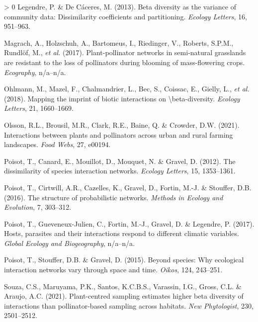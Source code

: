 \documentclass[10pt,oneside]{article}
\newlength{\cslhangindent}
\newenvironment{CSLReferences}[3] %
 {%
  \setlength{\parindent}{0pt}
  \ifodd #1 \everypar{\setlength{\hangindent}{\cslhangindent}}\ignorespaces\fi
  \ifnum #2 > 0
  \setlength{\parskip}{#2\baselineskip}
  \fi
 }%
 {}
\begin{document}
\begin{CSLReferences}{1}{0}
\leavevmode\hypertarget{ref-Legendre2013BetDiv}{}%
Legendre, P. \& De Cáceres, M. (2013). Beta diversity as the variance of
community data: Dissimilarity coefficients and partitioning.
\emph{Ecology Letters}, 16, 951--963.

\leavevmode\hypertarget{ref-Magrach2017PlaNet}{}%
Magrach, A., Holzschuh, A., Bartomeus, I., Riedinger, V., Roberts,
S.P.M., Rundlöf, M., \emph{et al.} (2017). Plant-pollinator networks in
semi-natural grasslands are resistant to the loss of pollinators during
blooming of mass-flowering crops. \emph{Ecography}, n/a--n/a.

\leavevmode\hypertarget{ref-Ohlmann2018MapImp}{}%
Ohlmann, M., Mazel, F., Chalmandrier, L., Bec, S., Coissac, E., Gielly,
L., \emph{et al.} (2018). Mapping the imprint of biotic interactions on
\textbackslash beta-diversity. \emph{Ecology Letters}, 21, 1660--1669.

\leavevmode\hypertarget{ref-Olsson2021IntPla}{}%
Olsson, R.L., Brousil, M.R., Clark, R.E., Baine, Q. \& Crowder, D.W.
(2021). Interactions between plants and pollinators across urban and
rural farming landscapes. \emph{Food Webs}, 27, e00194.

\leavevmode\hypertarget{ref-Poisot2012DisSpe}{}%
Poisot, T., Canard, E., Mouillot, D., Mouquet, N. \& Gravel, D. (2012).
The dissimilarity of species interaction networks. \emph{Ecology
Letters}, 15, 1353--1361.

\leavevmode\hypertarget{ref-Poisot2016StrPro}{}%
Poisot, T., Cirtwill, A.R., Cazelles, K., Gravel, D., Fortin, M.-J. \&
Stouffer, D.B. (2016). The structure of probabilistic networks.
\emph{Methods in Ecology and Evolution}, 7, 303--312.

\leavevmode\hypertarget{ref-Poisot2017HosPar}{}%
Poisot, T., Gueveneux-Julien, C., Fortin, M.-J., Gravel, D. \& Legendre,
P. (2017). Hosts, parasites and their interactions respond to different
climatic variables. \emph{Global Ecology and Biogeography}, n/a--n/a.

\leavevmode\hypertarget{ref-Poisot2015SpeWhy}{}%
Poisot, T., Stouffer, D.B. \& Gravel, D. (2015). Beyond species: Why
ecological interaction networks vary through space and time.
\emph{Oikos}, 124, 243--251.

\leavevmode\hypertarget{ref-Souza2021PlaSam}{}%
Souza, C.S., Maruyama, P.K., Santos, K.C.B.S., Varassin, I.G., Gross,
C.L. \& Araujo, A.C. (2021). Plant-centred sampling estimates higher
beta diversity of interactions than pollinator-based sampling across
habitats. \emph{New Phytologist}, 230, 2501--2512.


\end{CSLReferences}
\end{document}
